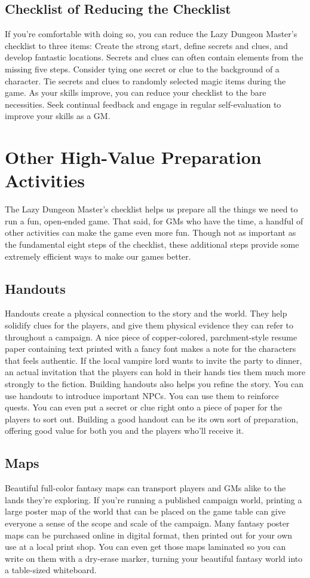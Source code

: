 \documentclass[10pt,a4paper,twoside,bg=print,twocolumn,openany,nodeprecatedcode]{dndbook}
\begin{document}
\subsection{Checklist of Reducing the Checklist}
If you're comfortable with doing so, you can reduce the Lazy Dungeon Master's checklist to three items: Create the strong start, define secrets and clues, and develop fantastic locations.
Secrets and clues can often contain elements from the missing five steps.
Consider tying one secret or clue to the background of a character.
Tie secrets and clues to randomly selected magic items during the game.
As your skills improve, you can reduce your checklist to the bare necessities.
Seek continual feedback and engage in regular self-evaluation to improve your skills as a GM.
\section{Other High-Value Preparation Activities}
The Lazy Dungeon Master's checklist helps us prepare all the things we need to run a fun, open-ended game. That said, for GMs who have the time, a handful of other activities can make the game even more fun. Though not as important as the fundamental eight steps of the checklist, these additional steps provide some extremely efficient ways to make our games better.
\subsection{Handouts}
Handouts create a physical connection to the story and the world. They help solidify clues for the players, and give them physical evidence they can refer to throughout a campaign. A nice piece of copper-colored, parchment-style resume paper containing text printed with a fancy font makes a note for the characters that feels authentic. If the local vampire lord wants to invite the party to dinner, an actual invitation that the players can hold in their hands ties them much more strongly to the fiction.
Building handouts also helps you refine the story. You can use handouts to introduce important NPCs. You can use them to reinforce quests. You can even put a secret or clue right onto a piece of paper for the players to sort out. Building a good handout can be its own sort of preparation, offering good value for both you and the players who'll receive it.
\subsection{Maps}
Beautiful full-color fantasy maps can transport players and GMs alike to the lands they're exploring. If you're running a published campaign world, printing a large poster map of the world that can be placed on the game table can give everyone a sense of the scope and scale of the campaign.
Many fantasy poster maps can be purchased online in digital format, then printed out for your own use at a local print shop. You can even get those maps laminated so you can write on them with a dry-erase marker, turning your beautiful fantasy world into a table-sized whiteboard.
\end{document}
